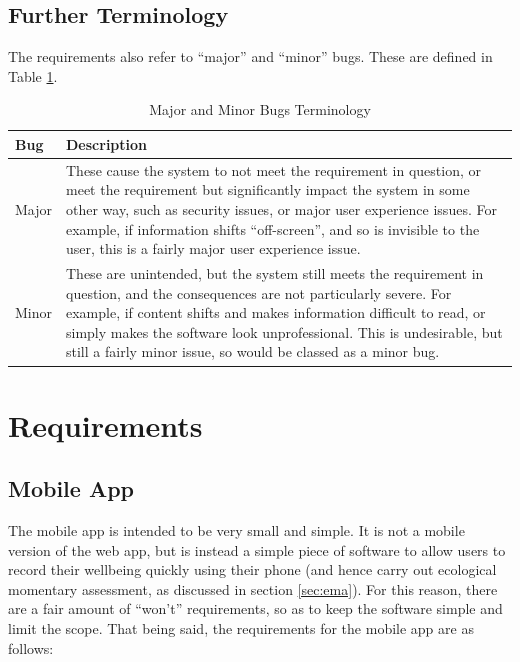 \documentclass[11pt,openright,a4paper]{report}
\begin{document}
\subsection{Further Terminology}
The requirements also refer to \enquote{major} and \enquote{minor} bugs. These are defined in Table \ref{table:bugsterminology}.
\begin{table}[ht]
\centering
\caption{Major and Minor Bugs Terminology}
\label{table:bugsterminology}
\begin{tabular}{|p{4cm}|p{10cm}|}
\hline
\textbf{Bug} & \textbf{Description} \\ \hline
Major & These cause the system to not meet the requirement in question, or meet the requirement but significantly impact the system in some other way, such as security issues, or major user experience issues. For example, if information shifts \enquote{off-screen}, and so is invisible to the user, this is a fairly major user experience issue. \\  \hline
Minor & These are unintended, but the system still meets the requirement in question, and the consequences are not particularly severe. For example, if content shifts and makes information difficult to read, or simply makes the software look unprofessional. This is undesirable, but still a fairly minor issue, so would be classed as a minor bug.\\ \hline
\end{tabular}
\end{table}

\section{Requirements} \label{reqs}
\subsection{Mobile App}
The mobile app is intended to be very small and simple. It is not a mobile version of the web app, but is instead a simple piece of software to allow users to record their wellbeing quickly using their phone (and hence carry out ecological momentary assessment, as discussed in section \ref{sec:ema}). For this reason, there are a fair amount of \enquote{won't} requirements, so as to keep the software simple and limit the scope. That being said, the requirements for the mobile app are as follows:
\end{document}
